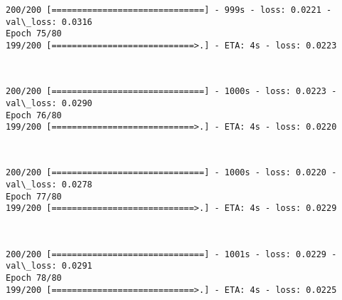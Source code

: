 \documentclass[11pt]{article}
\begin{document}
    \begin{Verbatim}[commandchars=\\\{\}]
200/200 [==============================] - 999s - loss: 0.0221 - val\_loss: 0.0316
Epoch 75/80
199/200 [============================>.] - ETA: 4s - loss: 0.0223
    \end{Verbatim}

    \begin{center}
    \end{center}
    { \hspace*{\fill} \\}
    
    \begin{Verbatim}[commandchars=\\\{\}]
200/200 [==============================] - 1000s - loss: 0.0223 - val\_loss: 0.0290
Epoch 76/80
199/200 [============================>.] - ETA: 4s - loss: 0.0220
    \end{Verbatim}

    \begin{center}
    \end{center}
    { \hspace*{\fill} \\}
    
    \begin{Verbatim}[commandchars=\\\{\}]
200/200 [==============================] - 1000s - loss: 0.0220 - val\_loss: 0.0278
Epoch 77/80
199/200 [============================>.] - ETA: 4s - loss: 0.0229
    \end{Verbatim}

    \begin{center}
    \end{center}
    { \hspace*{\fill} \\}
    
    \begin{Verbatim}[commandchars=\\\{\}]
200/200 [==============================] - 1001s - loss: 0.0229 - val\_loss: 0.0291
Epoch 78/80
199/200 [============================>.] - ETA: 4s - loss: 0.0225
    \end{Verbatim}

    \begin{center}
    \end{center}
    { \hspace*{\fill} \\}
    
\end{document}
